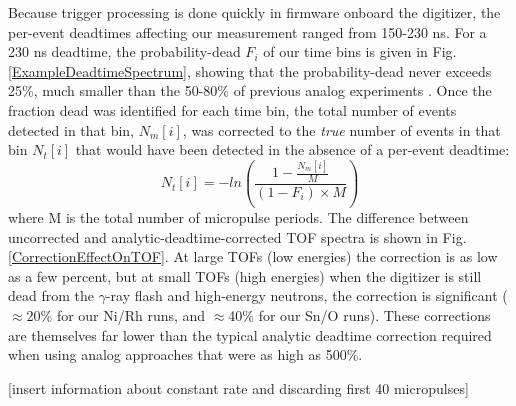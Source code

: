 \documentclass[twocolumn,secnumarabic,amssymb, nobibnotes, aps, prl,
superscriptaddress, nobalancelastpage]{revtex4}
\begin{document}
Because trigger processing is done quickly in
firmware onboard the digitizer, the per-event deadtimes affecting our
measurement ranged from 150-230 ns. For a 230 ns deadtime, the probability-dead
$F_{i}$ of our time bins is given in Fig.
\ref{ExampleDeadtimeSpectrum}, showing that the probability-dead never exceeds
25\%, much smaller than the 50-80\% of previous analog experiments \cite{Finlay1993,
Abfalterer2001}.
Once the fraction dead was identified for each time bin, the total number of
events detected in that bin, $N_{m}[i]$, was corrected to the \textit{true}
number of events in that bin $N_{t}[i]$ that would have been detected in the
absence of a
per-event deadtime:
\begin{equation}
    N_{t}[i] = -ln\left(\frac{1-\frac{N_m[i]}{M}}{(1-F_{i})\times M}\right)
\end{equation}
where M is the total number of micropulse periods. The difference between
uncorrected and analytic-deadtime-corrected TOF spectra is shown in Fig.
\ref{CorrectionEffectOnTOF}. At large TOFs (low energies) the correction is as low as a
few percent, but at small TOFs (high energies) when the digitizer is still dead
from the $\gamma$-ray flash and high-energy neutrons, the correction is significant
($\approx$20\% for our Ni/Rh runs, and $\approx$40\% for our Sn/O runs). These 
corrections are themselves far lower than the typical
analytic deadtime correction required when using analog approaches \cite{Finlay1993,
Abfalterer2001} that were as high as 500\%.%

[insert information about constant rate and discarding first 40 micropulses]
\end{document}
